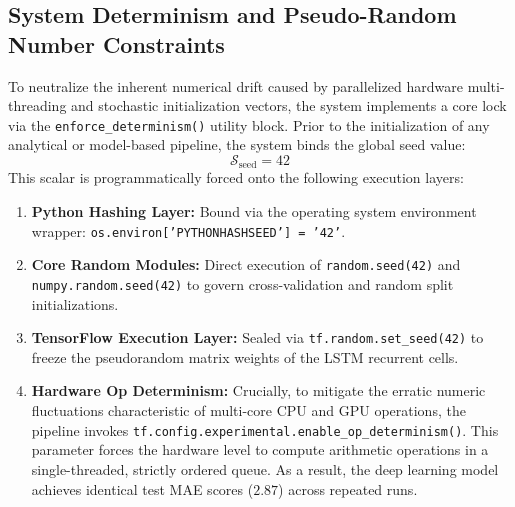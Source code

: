 \subsection{System Determinism and Pseudo-Random Number Constraints}
\label{subsec:determinism_constraints}

To neutralize the inherent numerical drift caused by parallelized hardware multi-threading and stochastic initialization vectors, the system implements a core lock via the \texttt{enforce\_determinism()} utility block. Prior to the initialization of any analytical or model-based pipeline, the system binds the global seed value:
\begin{equation}
\mathcal{S}_{\text{seed}} = 42
\end{equation}
This scalar is programmatically forced onto the following execution layers:
\begin{enumerate}
    \item \textbf{Python Hashing Layer:} Bound via the operating system environment wrapper: \texttt{os.environ['PYTHONHASHSEED'] = '42'}.
    \item \textbf{Core Random Modules:} Direct execution of \texttt{random.seed(42)} and \texttt{numpy.random.seed(42)} to govern cross-validation and random split initializations.
    \item \textbf{TensorFlow Execution Layer:} Sealed via \texttt{tf.random.set\_seed(42)} to freeze the pseudorandom matrix weights of the LSTM recurrent cells.
    \item \textbf{Hardware Op Determinism:} Crucially, to mitigate the erratic numeric fluctuations characteristic of multi-core CPU and GPU operations, the pipeline invokes \texttt{tf.config.experimental.enable\_op\_determinism()}. This parameter forces the hardware level to compute arithmetic operations in a single-threaded, strictly ordered queue. As a result, the deep learning model achieves identical test MAE scores ($2.87$) across repeated runs.
\end{enumerate}
